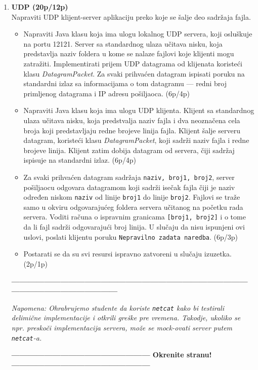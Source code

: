 \documentclass[]{article}
\begin{document}
\begin{enumerate}
\item \textbf{UDP (20p/12p)}
\\Napraviti UDP klijent-server aplikaciju preko koje se šalje deo sadržaja fajla.
\begin{itemize}
  \item Napraviti Java klasu koja ima ulogu lokalnog UDP servera, koji oslu\v{s}kuje na portu 12121.
  Server sa standardnog ulaza učitava nisku, koja predstavlja naziv foldera u kome se nalaze fajlovi koje klijenti mogu zatra\v{z}iti.
  Implementirati prijem UDP datagrama od klijenata koriste\'c{}i klasu \textit{DatagramPacket}. Za svaki prihvaćen datagram ispisati poruku na standardni izlaz sa informacijama o tom datagramu --- redni broj primljenog datagrama i IP adresu po\v{s}iljaoca. \hfill (6p/4p)
  \item Napraviti Java klasu koja ima ulogu UDP klijenta. Klijent sa standardnog ulaza učitava nisku, koja predstvalja naziv fajla i dva neoznačena cela broja koji predstavljaju redne brojeve linija fajla. Klijent šalje serveru datagram, koriste\'c{}i klasu \textit{DatagramPacket}, koji sadrži naziv fajla i redne brojeve linija. Klijent zatim dobija datagram od servera, \v{c}iji sadr\v{z}aj ispisuje na standardni izlaz. \hfill (6p/4p)
  \item Za svaki prihvaćen datagram sadržaja \texttt{naziv, broj1, broj2}, server po\v{s}iljaocu odgovara datagramom koji sadrži ise\v{c}ak fajla čiji je naziv određen niskom \texttt{naziv} od linije \texttt{broj1} do linije \texttt{broj2}. Fajlovi se tra\v{z}e samo u okviru odgovarajućeg foldera servera u\v{c}itanog na po\v{c}etku rada servera. Voditi računa o ispravnim granicama \texttt{[broj1, broj2]} i o tome da li fajl sadrži odgovarajući broj linija. U slučaju da nisu ispunjeni ovi uslovi, poslati klijentu poruku \texttt{Nepravilno zadata naredba}.
  \hfill (6p/3p)
  \item Postarati se da su svi resursi ispravno zatvoreni u slu\v{c}aju izuzetka. \hfill (2p/1p)
\end{itemize}

\vspace{15pt}
\begin{center}
  \textbf{------------------------------------------------------------------------------------------------------------------------------}
\end{center}
\textit{Napomena: Ohrabrujemo studente da koriste \texttt{netcat} kako bi testirali delimi\v{c}ne implementacije i otkrili gre\v{s}ke pre vremena. Takodje, ukoliko se npr. presko\v{c}i implementacija servera, mo\v{z}e se mock-ovati server putem \texttt{netcat}-a.} 
\begin{center}
  \textbf{--------------------------------------------------- Okrenite stranu! ---------------------------------------------------}
\end{center}
\newpage


\end{enumerate}
\end{document}
